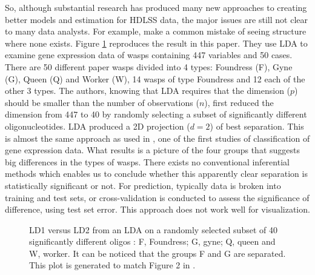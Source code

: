 So, although substantial research has produced many new approaches to creating better models and estimation for HDLSS data, the major issues are still not clear to many data analysts. For example, \cite{toth:2010} make a common mistake of seeing structure where none exists. Figure \ref{oligo} reproduces the result in this paper.  They use LDA to examine gene expression data of wasps containing 447 variables and 50 cases. There are 50 different paper wasps divided into 4 types: Foundress (F), Gyne (G), Queen (Q) and Worker (W), 14  wasps of type Foundress and 12 each of the other 3 types. The authors, knowing that LDA requires that the dimension ($p$) should be smaller than the number of observations ($n$), first reduced the dimension from 447 to 40 by randomly selecting a subset of significantly different oligonucleotides. LDA produced a 2D projection ($d=2$) of best separation. This is almost the same approach as used in \cite{dudoit:2002}, one of the first studies of classification of gene expression data. What results is a picture of the four groups that suggests big differences in the types of wasps. There exists no conventional inferential methods which enables us to conclude whether this apparently clear separation is statistically significant or not. For prediction, typically data is broken into training and test sets, or cross-validation is conducted to assess the significance of difference, using test set error. This approach does not work well for visualization.

\begin{figure}[hbtp]
   \centering
       \caption{LD1 versus LD2 from an LDA on a randomly selected subset of 40 significantly different oligos : F, Foundress; G, gyne; Q, queen and W, worker. It can be noticed that the groups F and G are separated. This plot is generated to match Figure 2 in \cite{toth:2010}. }
     \label{oligo}
\end{figure}  

